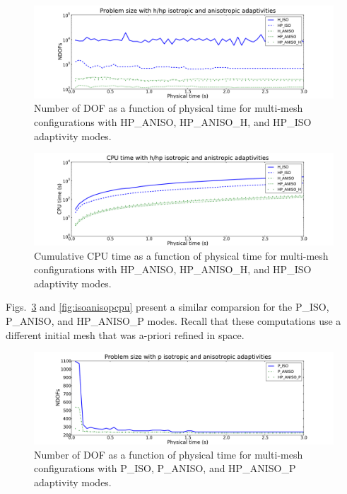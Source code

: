 \begin{figure}[!ht]
  \begin{centering}
  \includegraphics[width=\columnwidth]{isoaniso_dof}
  \caption{\label{fig:isoanisodof} Number of DOF as a function of physical time for 
  multi-mesh configurations with HP\_ANISO,
  HP\_ANISO\_H, and HP\_ISO adaptivity modes.}
  \end{centering}
\end{figure}

\begin{figure}[!ht]
  \begin{centering}
  \includegraphics[width=\columnwidth]{isoaniso_cpu}
  \caption{\label{fig:isoanisocpu} Cumulative CPU time as a function of physical time 
  for multi-mesh configurations with HP\_ANISO,
  HP\_ANISO\_H, and HP\_ISO adaptivity modes.}
  \end{centering}
\end{figure}

\noindent
Figs.~\ref{fig:isoanisopdof} and \ref{fig:isoanisopcpu} present a similar 
comparsion for the P\_ISO, P\_ANISO, and HP\_ANISO\_P modes. Recall that these 
computations use a different initial mesh that was a-priori refined in space.


\begin{figure}[!ht]
  \begin{centering}
  \includegraphics[width=\columnwidth]{isoanisop_dof}
  \caption{\label{fig:isoanisopdof} Number of DOF as a function of physical time
  for multi-mesh configurations with P\_ISO, P\_ANISO, and
  HP\_ANISO\_P adaptivity modes.}
  \end{centering}
\end{figure}

